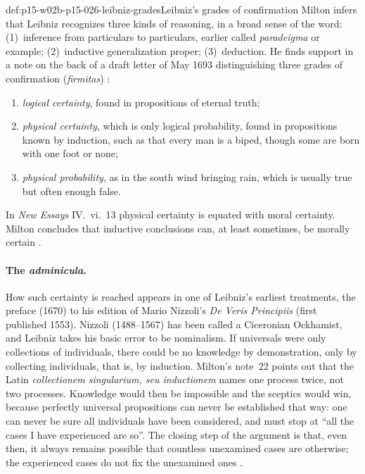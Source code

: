 \begin{hbdefinition}{def:p15-w02b-p15-026-leibniz-grades}{Leibniz's grades of confirmation}
Milton infers that Leibniz recognizes three kinds of reasoning, in a broad
sense of the word: (1)~inference from particulars to particulars,
earlier called \emph{paradeigma} or example; (2)~inductive generalization
proper; (3)~deduction. He finds support in a note on the back of a draft
letter of May 1693 distinguishing three grades of confirmation
(\emph{firmitas}) \cite[p.~34]{Milton2011InductionBeforeHume}:
\begin{enumerate}
\item \emph{logical certainty}, found in propositions of eternal truth;
\item \emph{physical certainty}, which is only logical probability, found in
  propositions known by induction, such as that every man is a biped,
  though some are born with one foot or none;
\item \emph{physical probability}, as in the south wind bringing rain, which
  is usually true but often enough false.
\end{enumerate}
In \emph{New Essays} IV.~vi.~13 physical certainty is equated with
moral certainty. Milton concludes that inductive conclusions can, at
least sometimes, be morally certain \cite[p.~34]{Milton2011InductionBeforeHume}.
\end{hbdefinition}

\paragraph{The \emph{adminicula}.}
How such certainty is reached appears in one of Leibniz's earliest
treatments, the preface (1670) to his edition of Mario Nizzoli's
\emph{De Veris Principiis} (first published 1553). Nizzoli (1488--1567)
has been called a Ciceronian Ockhamist, and Leibniz takes his basic error
to be nominalism. If universals were only collections of individuals, there
could be no knowledge by demonstration, only by collecting individuals,
that is, by induction. Milton's note~22 points out that the Latin
\emph{collectionem singularium, seu inductionem} names one process twice,
not two processes. Knowledge would then be impossible and the sceptics would
win, because perfectly universal propositions can never be established that
way: one can never be sure all individuals have been considered, and must
stop at ``all the cases I have experienced are so''. The closing step
of the argument is that, even then, it always remains possible that
countless unexamined cases are otherwise; the experienced cases do not
fix the unexamined ones \cite[p.~35]{Milton2011InductionBeforeHume}.

